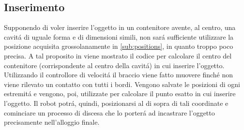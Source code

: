 \subsection{Inserimento} \label{sub:insertion}
Supponendo di voler inserire l'oggetto in un contenitore avente, al centro, una cavit\'{a} di uguale forma e di dimensioni simili, 
non sar\'{a} sufficiente utilizzare la posizione acquisita grossolanamente in \ref{sub:positions}, in quanto troppo poco precisa. 
A tal proposito in \cite{insertion} viene mostrato il codice per calcolare il centro del contenitore (corrispondente al 
centro della cavit\'{a}) in cui inserire l'oggetto. Utilizzando il controllore di velocit\'{a} il braccio viene fatto muovere 
finch\'{e} non viene rilevato un contatto con tutti i bordi. Vengono salvate le posizioni di ogni estremit\'{a} e vengono, poi, 
utilizzate per calcolare il punto esatto in cui inserire l'oggetto. Il robot potr\'{a}, quindi, posizionarsi al di sopra di 
tali coordinate e cominciare un processo di discesa che lo porter\'{a} ad incastrare l'oggetto precisamente nell'alloggio finale.
